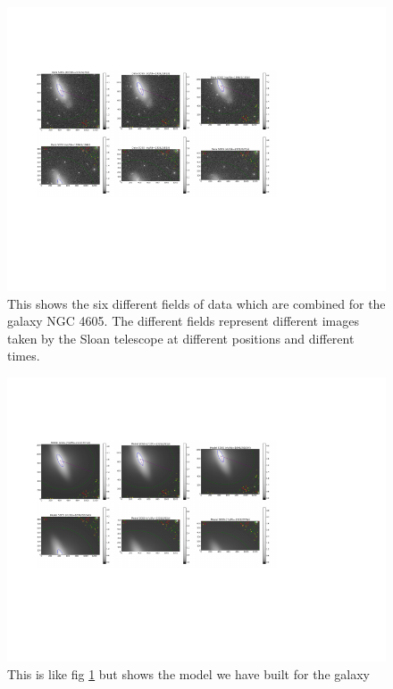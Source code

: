 \documentclass[12pt,preprint,pdftex]{aastex}
\begin{document}
\begin{figure}
\centering
\includegraphics[trim = 1cm 3.2cm 3.8cm 2.15cm,clip=true,width=\textwidth] {data.pdf}
\caption{This shows the six different fields of data which are
 combined for the galaxy NGC 4605. The different fields represent
 different images taken by the Sloan telescope at different positions
 and different times.}
\label{fig:4605data}
\end{figure}

\begin{figure}
\centering
\includegraphics[trim = 1cm 3.2cm 3.8cm 2.15cm,clip=true,width=\textwidth] {model.pdf}
\caption{This is like fig \ref{fig:4605data} but shows the model we have built for the galaxy}
\label{fig:4605model}
\end{figure}
\end{document}
